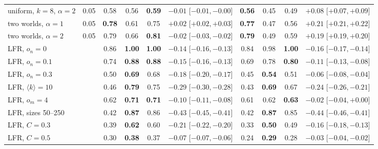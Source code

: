 \begin{table}[p]
\begin{ruledtabular}
\begin{tabular}{llccc c|ccc c}
uniform, $k{=}8$, $\alpha{=}2$ & 0.05 & 0.58 & 0.56 & \textbf{0.59} & $-0.01$ [$-0.01,-0.00$] & \textbf{0.56} & 0.45 & 0.49 & $+0.08$ [$+0.07,+0.09$] \\
two worlds, $\alpha{=}1$ & 0.05 & \textbf{0.78} & 0.61 & 0.75 & $+0.02$ [$+0.02,+0.03$] & \textbf{0.77} & 0.47 & 0.56 & $+0.21$ [$+0.21,+0.22$] \\
two worlds, $\alpha{=}2$ & 0.05 & 0.79 & 0.66 & \textbf{0.81} & $-0.02$ [$-0.03,-0.02$] & \textbf{0.79} & 0.49 & 0.59 & $+0.19$ [$+0.19,+0.20$] \\
\hline
LFR, $o_n{=}0$ &  & 0.86 & \textbf{1.00} & \textbf{1.00} & $-0.14$ [$-0.16,-0.13$] & 0.84 & 0.98 & \textbf{1.00} & $-0.16$ [$-0.17,-0.14$] \\
LFR, $o_n{=}0.1$ &  & 0.74 & \textbf{0.88} & \textbf{0.88} & $-0.15$ [$-0.16,-0.13$] & 0.69 & 0.78 & \textbf{0.80} & $-0.11$ [$-0.13,-0.08$] \\
LFR, $o_n{=}0.3$ &  & 0.50 & \textbf{0.69} & 0.68 & $-0.18$ [$-0.20,-0.17$] & 0.45 & \textbf{0.54} & 0.51 & $-0.06$ [$-0.08,-0.04$] \\
LFR, $\langle k\rangle{=}10$ &  & 0.46 & \textbf{0.79} & 0.75 & $-0.29$ [$-0.30,-0.28$] & 0.43 & \textbf{0.69} & 0.67 & $-0.24$ [$-0.26,-0.21$] \\
LFR, $o_m{=}4$ &  & 0.62 & \textbf{0.71} & \textbf{0.71} & $-0.10$ [$-0.11,-0.08$] & 0.61 & 0.62 & \textbf{0.63} & $-0.02$ [$-0.04,+0.00$] \\
LFR, sizes 50--250 &  & 0.42 & \textbf{0.87} & 0.86 & $-0.43$ [$-0.45,-0.41$] & 0.42 & \textbf{0.87} & 0.85 & $-0.44$ [$-0.46,-0.41$] \\
LFR, $C{=}0.3$ &  & 0.39 & \textbf{0.62} & 0.60 & $-0.21$ [$-0.22,-0.20$] & 0.33 & \textbf{0.50} & 0.49 & $-0.16$ [$-0.18,-0.13$] \\
LFR, $C{=}0.5$ &  & 0.30 & \textbf{0.38} & 0.37 & $-0.07$ [$-0.07,-0.06$] & 0.24 & \textbf{0.29} & 0.28 & $-0.03$ [$-0.04,-0.02$] \\
\end{tabular}
\end{ruledtabular}
\end{table}
